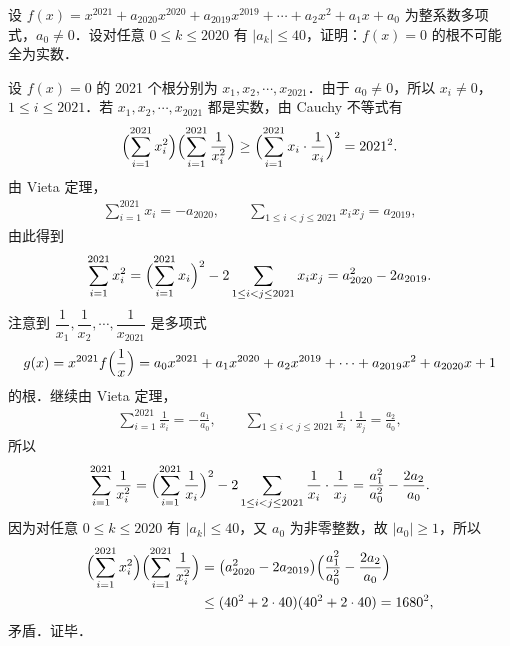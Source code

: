 设 $f(x)=x^{2021}+a_{2020}x^{2020}+a_{2019}x^{2019}+\cdots+a_2x^2+a_1x+a_0$ 为整系数多项式，$a_0\ne0$．设对任意 $0\le k\le2020$ 有 $|a_k|\le40$，证明：$f(x)=0$ 的根不可能全为实数．
\begin{solution}
设 $f(x)=0$ 的 2021 个根分别为 $x_1,x_2,\cdots,x_{2021}$．由于 $a_0\ne0$，所以 $x_i\ne0$，$1\le i\le2021$．若 $x_1,x_2,\cdots,x_{2021}$ 都是实数，由 Cauchy 不等式有
\begin{align*}
  \Bigl(\sum_{i=1}^{2021}x_i^2\Bigr)\Bigl(\sum_{i=1}^{2021}\frac{1}{x_i^2}\Bigr)\ge\Bigl(\sum_{i=1}^{2021}x_i\cdot\frac{1}{x_i}\Bigr)^2=2021^2.
\end{align*}
由 Vieta 定理，
\begin{align*}
  \sum_{i=1}^{2021}x_i=-a_{2020},\qquad
  \sum_{1\le i<j\le2021}x_ix_j=a_{2019},
\end{align*}
由此得到
\begin{align*}
  \sum_{i=1}^{2021}x_i^2=\Bigl(\sum_{i=1}^{2021}x_i\Bigr)^2-2\sum_{1\le i<j\le2021}x_ix_j=a_{2020}^2-2a_{2019}.
\end{align*}
注意到 $\dfrac{1}{x_1},\dfrac{1}{x_2},\cdots,\dfrac{1}{x_{2021}}$ 是多项式
\[
  g(x)=x^{2021}f\Bigl(\frac{1}{x}\Bigr)=a_0x^{2021}+a_1x^{2020}+a_2x^{2019}+\cdots+a_{2019}x^2+a_{2020}x+1
\]
的根．继续由 Vieta 定理，
\begin{align*}
  \sum_{i=1}^{2021}\frac{1}{x_i}=-\frac{a_1}{a_0},\qquad
  \sum_{1\le i<j\le2021}\frac{1}{x_i}\cdot\frac{1}{x_j}=\frac{a_2}{a_0},
\end{align*}
所以
\begin{align*}
  \sum_{i=1}^{2021}\frac{1}{x_i^2}=\Bigl(\sum_{i=1}^{2021}\frac{1}{x_i}\Bigr)^2-2\sum_{1\le i<j\le2021}\frac{1}{x_i}\cdot\frac{1}{x_j}=\frac{a_1^2}{a_0^2}-\frac{2a_2}{a_0}.
\end{align*}
因为对任意 $0\le k\le2020$ 有 $|a_k|\le40$，又 $a_0$ 为非零整数，故 $|a_0|\ge1$，所以
\begin{align*}
  \Bigl(\sum_{i=1}^{2021}x_i^2\Bigr)\Bigl(\sum_{i=1}^{2021}\frac{1}{x_i^2}\Bigr)&=\bigl(a_{2020}^2-2a_{2019}\bigr)\Bigl(\frac{a_1^2}{a_0^2}-\frac{2a_2}{a_0}\Bigr)\\
  &\le(40^2+2\cdot40)(40^2+2\cdot40)=1680^2,
\end{align*}
矛盾．证毕．
\end{solution}

